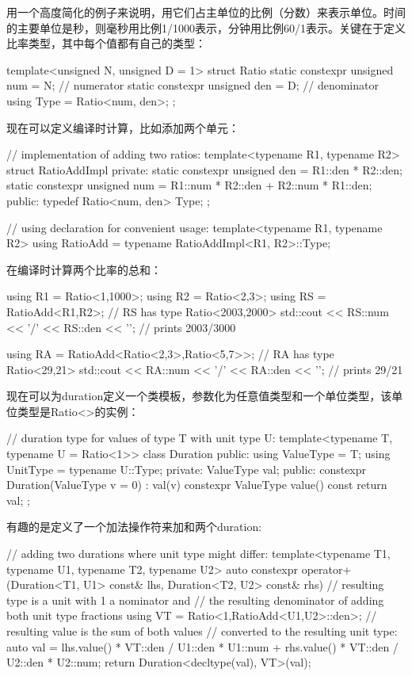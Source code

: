 用一个高度简化的例子来说明，用它们占主单位的比例（分数）来表示单位。时间的主要单位是秒，则毫秒用比例1/1000表示，分钟用比例60/1表示。关键在于定义比率类型，其中每个值都有自己的类型：

\begin{cpp}
template<unsigned N, unsigned D = 1>
struct Ratio {
	static constexpr unsigned num = N; // numerator
	static constexpr unsigned den = D; // denominator
	using Type = Ratio<num, den>;
};
\end{cpp}

现在可以定义编译时计算，比如添加两个单元：

\begin{cpp}
// implementation of adding two ratios:
template<typename R1, typename R2>
struct RatioAddImpl
{
	private:
	static constexpr unsigned den = R1::den * R2::den;
	static constexpr unsigned num = R1::num * R2::den + R2::num * R1::den;
	public:
	typedef Ratio<num, den> Type;
};

// using declaration for convenient usage:
template<typename R1, typename R2>
using RatioAdd = typename RatioAddImpl<R1, R2>::Type;
\end{cpp}

在编译时计算两个比率的总和：

\begin{cpp}
using R1 = Ratio<1,1000>;
using R2 = Ratio<2,3>;
using RS = RatioAdd<R1,R2>; // RS has type Ratio<2003,2000>
std::cout << RS::num << '/' << RS::den << '\n'; // prints 2003/3000

using RA = RatioAdd<Ratio<2,3>,Ratio<5,7>>; // RA has type Ratio<29,21>
std::cout << RA::num << '/' << RA::den << '\n'; // prints 29/21
\end{cpp}

现在可以为duration定义一个类模板，参数化为任意值类型和一个单位类型，该单位类型是Ratio<>的实例：

\begin{cpp}
// duration type for values of type T with unit type U:
template<typename T, typename U = Ratio<1>>
class Duration {
	public:
	using ValueType = T;
	using UnitType = typename U::Type;
	private:
	ValueType val;
	public:
	constexpr Duration(ValueType v = 0)
	: val(v) {
	}
	constexpr ValueType value() const {
		return val;
	}
};
\end{cpp}

有趣的是定义了一个加法操作符来加和两个duration:

\begin{cpp}
// adding two durations where unit type might differ:
template<typename T1, typename U1, typename T2, typename U2>
auto constexpr operator+(Duration<T1, U1> const& lhs,
						 Duration<T2, U2> const& rhs)
{
	// resulting type is a unit with 1 a nominator and
	// the resulting denominator of adding both unit type fractions
	using VT = Ratio<1,RatioAdd<U1,U2>::den>;
	// resulting value is the sum of both values
	// converted to the resulting unit type:
	auto val = lhs.value() * VT::den / U1::den * U1::num +
				rhs.value() * VT::den / U2::den * U2::num;
	return Duration<decltype(val), VT>(val);
}
\end{cpp}

